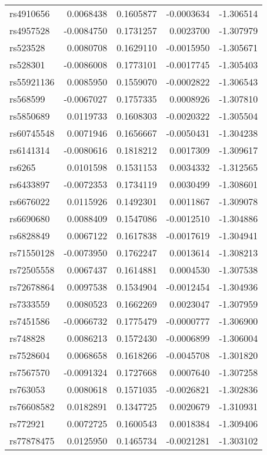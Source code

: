 \documentclass[
]{article}
\theoremstyle{plain}
\begin{document}
\begin{longtable}[t]{lrrrr}
rs4910656 & 0.0068438 & 0.1605877 & -0.0003634 & -1.306514\\
rs4957528 & -0.0084750 & 0.1731257 & 0.0023700 & -1.307979\\
rs523528 & 0.0080708 & 0.1629110 & -0.0015950 & -1.305671\\
rs528301 & -0.0086008 & 0.1773101 & -0.0017745 & -1.305403\\
rs55921136 & 0.0085950 & 0.1559070 & -0.0002822 & -1.306543\\
\addlinespace
rs568599 & -0.0067027 & 0.1757335 & 0.0008926 & -1.307810\\
rs5850689 & 0.0119733 & 0.1608303 & -0.0020322 & -1.305504\\
rs60745548 & 0.0071946 & 0.1656667 & -0.0050431 & -1.304238\\
rs6141314 & -0.0080616 & 0.1818212 & 0.0017309 & -1.309617\\
rs6265 & 0.0101598 & 0.1531153 & 0.0034332 & -1.312565\\
\addlinespace
rs6433897 & -0.0072353 & 0.1734119 & 0.0030499 & -1.308601\\
rs6676022 & 0.0115926 & 0.1492301 & 0.0011867 & -1.309078\\
rs6690680 & 0.0088409 & 0.1547086 & -0.0012510 & -1.304886\\
rs6828849 & 0.0067122 & 0.1617838 & -0.0017619 & -1.304941\\
rs71550128 & -0.0073950 & 0.1762247 & 0.0013614 & -1.308213\\
\addlinespace
rs72505558 & 0.0067437 & 0.1614881 & 0.0004530 & -1.307538\\
rs72678864 & 0.0097538 & 0.1534904 & -0.0012454 & -1.304936\\
rs7333559 & 0.0080523 & 0.1662269 & 0.0023047 & -1.307959\\
rs7451586 & -0.0066732 & 0.1775479 & -0.0000777 & -1.306900\\
rs748828 & 0.0086213 & 0.1572430 & -0.0006899 & -1.306004\\
\addlinespace
rs7528604 & 0.0068658 & 0.1618266 & -0.0045708 & -1.301820\\
rs7567570 & -0.0091324 & 0.1727668 & 0.0007640 & -1.307258\\
rs763053 & 0.0080618 & 0.1571035 & -0.0026821 & -1.302836\\
rs76608582 & 0.0182891 & 0.1347725 & 0.0020679 & -1.310931\\
rs772921 & 0.0072725 & 0.1600543 & 0.0018384 & -1.309406\\
\addlinespace
rs77878475 & 0.0125950 & 0.1465734 & -0.0021281 & -1.303102\\

\end{longtable}
\end{document}
